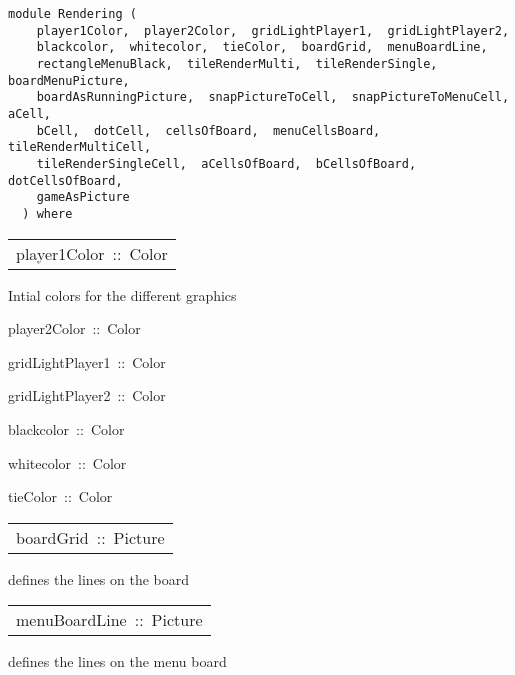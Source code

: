 \label{module:Rendering}
\haddockbeginheader
{\haddockverb\begin{verbatim}
module Rendering (
    player1Color,  player2Color,  gridLightPlayer1,  gridLightPlayer2, 
    blackcolor,  whitecolor,  tieColor,  boardGrid,  menuBoardLine, 
    rectangleMenuBlack,  tileRenderMulti,  tileRenderSingle,  boardMenuPicture, 
    boardAsRunningPicture,  snapPictureToCell,  snapPictureToMenuCell,  aCell, 
    bCell,  dotCell,  cellsOfBoard,  menuCellsBoard,  tileRenderMultiCell, 
    tileRenderSingleCell,  aCellsOfBoard,  bCellsOfBoard,  dotCellsOfBoard, 
    gameAsPicture
  ) where\end{verbatim}}
\haddockendheader

\begin{haddockdesc}
\item[\begin{tabular}{@{}l}
player1Color\ ::\ Color
\end{tabular}]\haddockbegindoc
Intial colors for the different graphics\par

\end{haddockdesc}
\begin{haddockdesc}
\item[
player2Color\ ::\ Color
]
\item[
gridLightPlayer1\ ::\ Color
]
\item[
gridLightPlayer2\ ::\ Color
]
\item[
blackcolor\ ::\ Color
]
\item[
whitecolor\ ::\ Color
]
\item[
tieColor\ ::\ Color
]
\end{haddockdesc}
\begin{haddockdesc}
\item[\begin{tabular}{@{}l}
boardGrid\ ::\ Picture
\end{tabular}]\haddockbegindoc
{} defines the lines on the board\par

\end{haddockdesc}
\begin{haddockdesc}
\item[\begin{tabular}{@{}l}
menuBoardLine\ ::\ Picture
\end{tabular}]\haddockbegindoc
{} defines the lines on the menu board\par

\end{haddockdesc}
